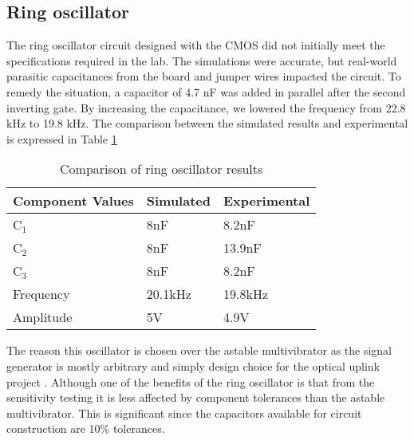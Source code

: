 \subsection{Ring oscillator}
The ring oscillator circuit designed with the CMOS did not initially meet the specifications required in the lab. The simulations were accurate, but real-world parasitic capacitances from the board and jumper wires impacted the circuit. To remedy the situation, a capacitor of 4.7 nF was added in parallel after the second inverting gate. By increasing the capacitance, we lowered
the frequency from 22.8 kHz to 19.8 kHz. The comparison between the simulated results and experimental is expressed in Table \ref{tab:simvexpring}

\begin{table}[H]
	\centering
	\caption{Comparison of ring oscillator results}
	\label{tab:simvexpring}
	\begin{tabular}{|l|l|l|}
		\hline
		Component Values & Simulated & Experimental \\ \hline
		C$_1$            & 8nF       & 8.2nF        \\ \hline
		C$_2$            & 8nF       & 13.9nF       \\ \hline
		C$_3$            & 8nF       & 8.2nF        \\ \hline
		Frequency        & 20.1kHz   & 19.8kHz      \\ \hline
		Amplitude        & 5V        & 4.9V         \\ \hline
	\end{tabular}
	\end{table}
The reason this oscillator is chosen over the astable multivibrator as the signal generator is mostly arbitrary and simply design choice for the optical uplink project \cite{b4}. Although one of the benefits of the ring oscillator is that from the sensitivity testing it is less affected by component tolerances than the astable multivibrator. This is significant since the capacitors available for circuit construction are 10\% tolerances.


